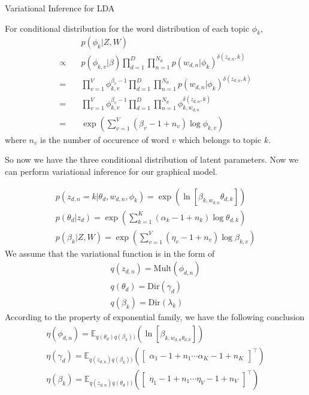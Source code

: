 \documentclass{beamer}
\newcommand\mat[1]{\begin{bmatrix}#1\end{bmatrix}}
\begin{document}
\begin{frame}[allowframebreaks]{Variational Inference for LDA}
\framebreak

For conditional distribution for the word distribution of each topic $\phi_k$,
\begin{align*}
& p(\phi_k | Z, W) \\
\propto \quad &  p(\phi_{k,v} | \beta) \prod_{d=1}^D\prod_{n=1}^{N_d} p(w_{d,n} | \phi_k)^{\delta(z_{d,n}, k)}\\
= \quad & \prod_{v=1}^V \phi_{k,v}^{\beta_v - 1}\prod_{d=1}^D\prod_{n=1}^{N_d} p(w_{d,n} | \phi_k)^{\delta(z_{d,n}, k)} \\
= \quad & \prod_{v=1}^V \phi_{k,v}^{\beta_v - 1}\prod_{d=1}^D\prod_{n=1}^{N_d} \phi_{k, w_{d,n}}^{\delta(z_{d,n}, k)} \\
= \quad & \exp (\sum_{v=1}^V (\beta_v - 1 +  n_v) \log \phi_{k,v}) 
\end{align*}
where $n_v$ is the number of occurence of word $v$ which belongs to topic $k$.

So now we have the three conditional distribution of latent parameters. Now we can perform variational inference for our graphical model.

\begin{gather*}
p(z_{d,n} = k | \theta_d, w_{d,n}, \phi_k)  =  \exp (\ln [\beta_{k, w_{d,n}}\theta_{d,k}])\\
p(\theta_d | z_d)  = \exp (\sum_{k=1}^K (\alpha_k - 1 + n_k) \log \theta_{d,k}) \\
p(\beta_k | Z, W)  = \exp (\sum_{v=1}^V (\eta_v - 1 +  n_v) \log \beta_{k,v}) 
\end{gather*}
We assume that the variational function is in the form of 
\begin{gather*}
q(z_{d,n})=\text{Mult}(\phi_{d,n})\\
q(\theta_d)=\text{Dir}(\gamma_d)\\
q(\beta_k) = \text{Dir}(\lambda_k)
\end{gather*}
According to the property of exponential family, we have the following conclusion
\begin{gather*}
\eta(\phi_{d,n}) = \mathbb{E}_{q(\theta_d) q(\beta_k))}(\ln [\beta_{k, w_{d,n}\theta_{d,k}}])\\
\eta(\gamma_d) = \mathbb{E}_{q(z_{d,n}) q(\beta_k))}(\mat{\alpha_1 - 1 + n_1 \cdots \alpha_K - 1 + n_K}^\top)\\
\eta(\beta_k) = \mathbb{E}_{q(z_{d,n}) q(\theta_d))}(\mat{\eta_1 - 1 + n_1 \cdots \eta_V - 1 + n_V}^\top)
\end{gather*}


\end{frame}
\end{document}
